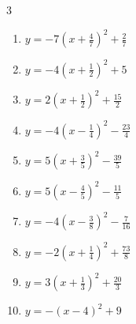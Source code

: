 \begin{multicols}{3}
\begin{enumerate}
  \item $\displaystyle y=-7\left( x+\frac{4}{7}\right)^{2}+\frac{2}{7}$


  \item $\displaystyle y=-4\left( x+\frac{1}{2}\right)^{2}+5$


  \item $\displaystyle y=2\left( x+\frac{1}{2}\right)^{2}+\frac{15}{2}$


\columnbreak %

  \item $\displaystyle y=-4\left( x-\frac{1}{4}\right)^{2}-\frac{23}{4}$


  \item $\displaystyle y=5\left( x+\frac{3}{5}\right)^{2}-\frac{39}{5}$


  \item $\displaystyle y=5\left( x-\frac{4}{5}\right)^{2}-\frac{11}{5}$


  \item $\displaystyle y=-4\left( x-\frac{3}{8}\right)^{2}-\frac{7}{16}$


  \item $\displaystyle y=-2\left( x+\frac{1}{4}\right)^{2}+\frac{73}{8}$


  \item $\displaystyle y=3\left( x+\frac{1}{3}\right)^{2}+\frac{20}{3}$


  \item $\displaystyle y=-\left( x-4\right)^{2}+9$


\end{enumerate}
\end{multicols}
